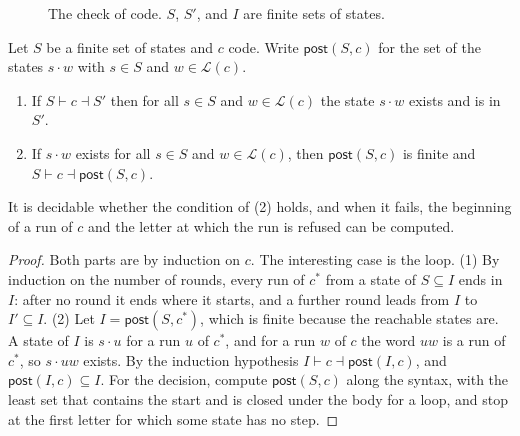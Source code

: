\documentclass[acmsmall,nonacm,screen]{acmart}
\newcommand{\kw}[1]{\mathsf{#1}}
\newcommand{\lang}[1]{\mathcal{L}(#1)}
\newcommand{\step}[1]{\xrightarrow{\,#1\,}}
\newcommand{\post}[2]{\kw{post}(#1, #2)}
\begin{document}
\begin{figure}
\caption{The check of code. $S$, $S'$, and $I$ are finite sets of states.}
\label{fig:code}
\end{figure}

\begin{theorem}
\label{thm:code}
Let $S$ be a finite set of states and $c$ code. Write $\post{S}{c}$ for the set of the
states $s \cdot w$ with $s \in S$ and $w \in \lang{c}$.
\begin{enumerate}
\item If $S \vdash c \dashv S'$ then for all $s \in S$ and $w \in \lang{c}$ the state
  $s \cdot w$ exists and is in $S'$.
\item If $s \cdot w$ exists for all $s \in S$ and $w \in \lang{c}$, then $\post{S}{c}$ is
  finite and $S \vdash c \dashv \post{S}{c}$.
\end{enumerate}
It is decidable whether the condition of (2) holds, and when it fails, the beginning of a
run of $c$ and the letter at which the run is refused can be computed.
\end{theorem}

\begin{proof}
Both parts are by induction on $c$. The interesting case is the loop. (1) By induction on
the number of rounds, every run of $c^{*}$ from a state of $S \subseteq I$ ends in $I$:
after no round it ends where it starts, and a further round leads from $I$ to $I' \subseteq
I$. (2) Let $I = \post{S}{c^{*}}$, which is finite because the reachable states are. A state
of $I$ is $s \cdot u$ for a run $u$ of $c^{*}$, and for a run $w$ of $c$ the word $uw$ is a
run of $c^{*}$, so $s \cdot uw$ exists. By the induction hypothesis $I \vdash c \dashv
\post{I}{c}$, and $\post{I}{c} \subseteq I$. For the decision, compute $\post{S}{c}$ along
the syntax, with the least set that contains the start and is closed under the body for a
loop, and stop at the first letter for which some state has no step.
\end{proof}
\end{document}
